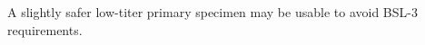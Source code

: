 \documentclass[paper.tex]{subfiles}
\begin{document}
	
A slightly safer low-titer primary specimen may be usable to avoid BSL-3 requirements.
	
\end{document}
